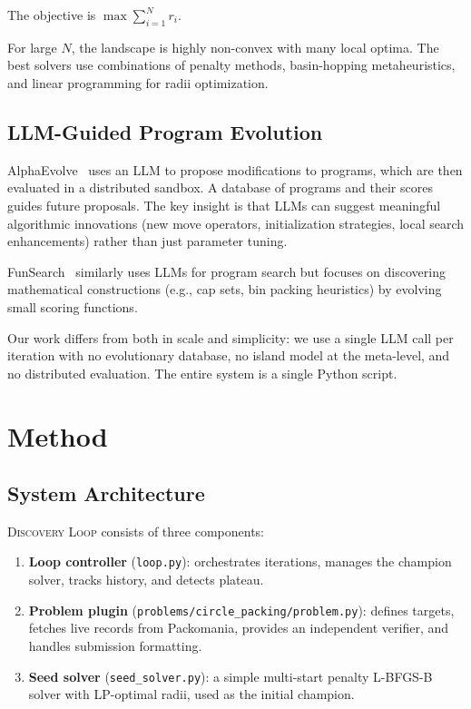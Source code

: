 \documentclass[11pt]{article}
\begin{document}
The objective is $\max \sum_{i=1}^N r_i$.

For large $N$, the landscape is highly non-convex with many local optima. The best solvers
use combinations of penalty methods, basin-hopping metaheuristics, and linear programming
for radii optimization.

\subsection{LLM-Guided Program Evolution}

AlphaEvolve~\citep{alphaevolve2025} uses an LLM to propose modifications to programs, which
are then evaluated in a distributed sandbox. A database of programs and their scores guides
future proposals. The key insight is that LLMs can suggest meaningful algorithmic innovations
(new move operators, initialization strategies, local search enhancements) rather than just
parameter tuning.

FunSearch~\citep{funsearch2024} similarly uses LLMs for program search but focuses on
discovering mathematical constructions (e.g., cap sets, bin packing heuristics) by evolving
small scoring functions.

Our work differs from both in scale and simplicity: we use a single LLM call per iteration
with no evolutionary database, no island model at the meta-level, and no distributed
evaluation. The entire system is a single Python script.

\section{Method}

\subsection{System Architecture}

\textsc{Discovery Loop} consists of three components:

\begin{enumerate}
  \item \textbf{Loop controller} (\texttt{loop.py}): orchestrates iterations, manages the
        champion solver, tracks history, and detects plateau.
  \item \textbf{Problem plugin} (\texttt{problems/circle\_packing/problem.py}): defines
        targets, fetches live records from Packomania, provides an independent verifier,
        and handles submission formatting.
  \item \textbf{Seed solver} (\texttt{seed\_solver.py}): a simple multi-start penalty
        L-BFGS-B solver with LP-optimal radii, used as the initial champion.
\end{enumerate}
\end{document}
